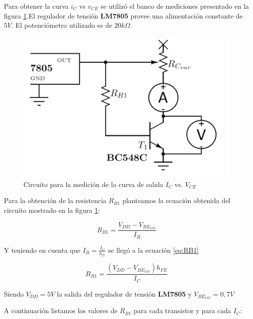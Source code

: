\documentclass[10pt,spanish,a4paper,openany,notitlepage]{article}
\begin{document}
Para obtener la curva $i_C$ vs $v_{CE}$ se utilizó el banco de mediciones 
presentado en la figura \ref{circuito:medicion_salida}.El regulador de 
tensión \textbf{LM7805} provee una alimentación constante de $5\unit{V}$. 
El potenciómetro utilizado es de $20 \unit{k\Omega}$.

\begin{figure}[H] %
\begin{center}
\includegraphics[scale=0.2]{./imagenes/ic_vce.jpg}
\caption{Circuito para la medición de la curva de salida $I_C$ vs. $V_{CE}$}
 \label{circuito:medicion_salida}
\end{center}
\end{figure}

Para la obtención de la resistencia $R_{B1}$ planteamos la ecuación obtenida 
del circuito mostrado en la figura \ref{circuito:medicion_salida}:

\[ \displaystyle R_{B1} = \frac{V_{DD} - V_{BE_{ON}}}{I_B} \]


Y teniendo en cuenta que $I_B = \frac{I_C}{h_{fe}}$ se llegó a la ecuación \ref{eq:RB1}

\begin{equation}
R_{B1} = \frac{(V_{DD} - V_{BE_{ON}}) h_{FE}}{I_C}
\label{eq:RB1}
\end{equation}

Siendo $V_{DD} = 5 \unit{V}$ la salida del regulador de tensión  \textbf{LM7805} y $V_{BE_{ON}} = 0,7 \unit{V}$

A continuación listamos los valores de $R_{B1}$ para cada transistor y para cada $I_C$:
\end{document}
